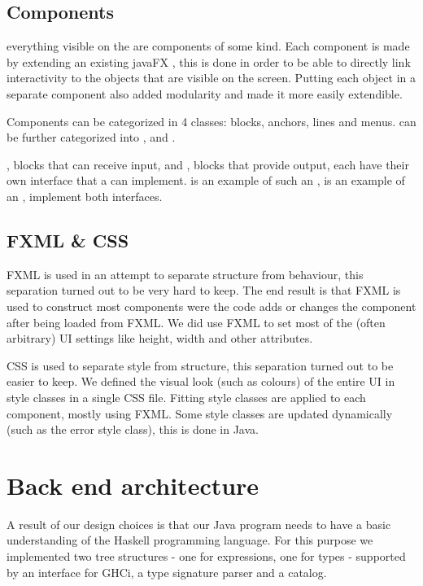 \subsection{Components}
everything visible on the  are components of some kind.
Each component is made by extending an existing javaFX , this is done in order to be able to directly link interactivity to the objects that are visible on the screen.
Putting each object in a separate component also added modularity and made it more easily extendible.

Components can be categorized in 4 classes: blocks, anchors, lines and menus.
 can be further categorized into ,  and .

, blocks that can receive input, and , blocks that provide output, each have their own interface that a  can implement.  is an example of such an ,  is an example of an ,  implement both interfaces.

\subsection{FXML \& CSS}
FXML is used in an attempt to separate structure from behaviour, this separation turned out to be very hard to keep. The end result is that FXML is used to construct most components were the code adds or changes the component after being loaded from FXML. We did use FXML to set most of the (often arbitrary) UI settings like height, width and other attributes.

CSS is used to separate style from structure, this separation turned out to be easier to keep. We defined the visual look (such as colours) of the entire UI in style classes in a single CSS file. Fitting style classes are applied to each component, mostly using FXML. Some style classes are updated dynamically (such as the error style class), this is done in Java.

\section{Back end architecture}

A result of our design choices is that our Java program needs to have a basic understanding of the Haskell programming
language. For this purpose we implemented two tree structures - one for expressions, one for types - supported by an
interface for GHCi, a type signature parser and a catalog.

